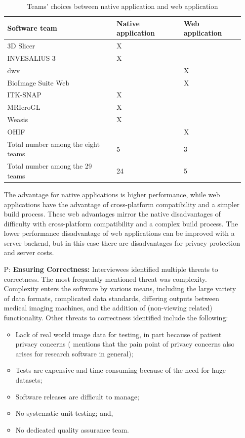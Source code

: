 \documentclass[final, 3p, times, authoryear]{elsarticle}
\newcounter{pnum} %
\begin{document}
\begin{enumerate}
\begin{table}[!ht]
\centering
\begin{tabular}{lll}
\toprule
Software team & Native application & Web application \\ 
\midrule
3D Slicer & X & \\
INVESALIUS 3 & X & \\
dwv & & X \\
BioImage Suite Web & & X \\
ITK-SNAP & X & \\
MRIcroGL & X & \\
Weasis & X & \\
OHIF & & X \\ 
\midrule
Total number among the eight teams & 5 & 3 \\
Total number among the 29 teams & 24 & 5 \\ 
\bottomrule
\end{tabular}
\caption{Teams' choices between native application and web application}
\label{tab_native_vs_web}
\end{table}

The advantage for native applications is higher performance, while web
applications have the advantage of cross-platform compatibility and a simpler
build process.  These web advantages mirror the native disadvantages of
difficulty with cross-platform compatibility and a complex build process.  The
lower performance disadvantage of web applications can be improved with a server
backend, but in this case there are disadvantages for privacy protection and
server costs.

\item[P\refstepcounter{pnum}\thepnum \label{P_Correctness}:]
\textbf{Ensuring Correctness:} Interviewees identified multiple threats to
correctness.  The most frequently mentioned threat was complexity.  Complexity
enters the software by various means, including the large variety of data formats,
complicated data standards, differing outputs between medical imaging machines,
and the addition of (non-viewing related) functionality.  Other threats to
correctness identified include the following:

\begin{itemize}
\item Lack of real world image data for testing, in part because of patient
privacy concerns (\citet{WieseEtAl2019} mentions that the pain point of privacy
concerns also arises for research software in general);
\item Tests are expensive and time-consuming because of the need for huge datasets;
\item Software releases are difficult to manage;
\item No systematic unit testing; and,
\item No dedicated quality assurance team.
\end{itemize}


\end{enumerate}
\end{document}
